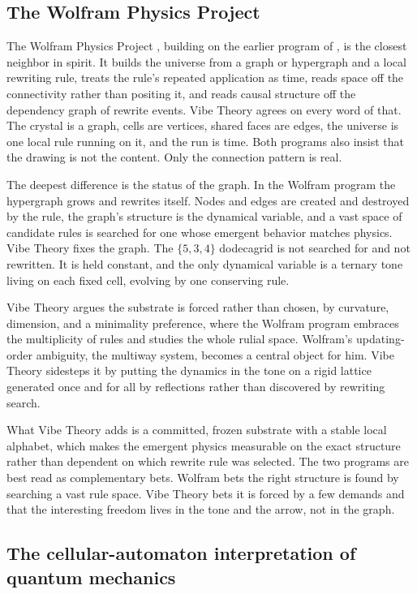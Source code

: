 \subsection{The Wolfram Physics Project}

The Wolfram Physics Project \cite{wolfram2020}, building on the earlier program of \cite{wolfram2002}, is the
closest neighbor in spirit. It builds the universe from a graph or hypergraph and a local rewriting rule,
treats the rule's repeated application as time, reads space off the connectivity rather than positing it, and
reads causal structure off the dependency graph of rewrite events. Vibe Theory agrees on every word of that.
The crystal is a graph, cells are vertices, shared faces are edges, the universe is one local rule running on
it, and the run is time. Both programs also insist that the drawing is not the content. Only the connection
pattern is real.

The deepest difference is the status of the graph. In the Wolfram program the hypergraph grows and rewrites
itself. Nodes and edges are created and destroyed by the rule, the graph's structure is the dynamical
variable, and a vast space of candidate rules is searched for one whose emergent behavior matches physics.
Vibe Theory fixes the graph. The $\{5,3,4\}$ dodecagrid is not searched for and not rewritten. It is held
constant, and the only dynamical variable is a ternary tone living on each fixed cell, evolving by one
conserving rule.

Vibe Theory argues the substrate is forced rather than chosen, by curvature, dimension, and a
minimality preference, where the Wolfram program embraces the multiplicity of rules and studies the whole
rulial space. Wolfram's updating-order ambiguity, the multiway system, becomes a central object for him. Vibe
Theory sidesteps it by putting the dynamics in the tone on a rigid lattice generated once and for all by
reflections rather than discovered by rewriting search.

What Vibe Theory adds is a committed, frozen substrate with a stable local alphabet, which makes the emergent
physics measurable on the exact structure rather than dependent on which rewrite rule was selected. The two
programs are best read as complementary bets. Wolfram bets the right structure is found by searching a vast
rule space. Vibe Theory bets it is forced by a few demands and that the interesting freedom lives in the tone
and the arrow, not in the graph.

\subsection{The cellular-automaton interpretation of quantum mechanics}

